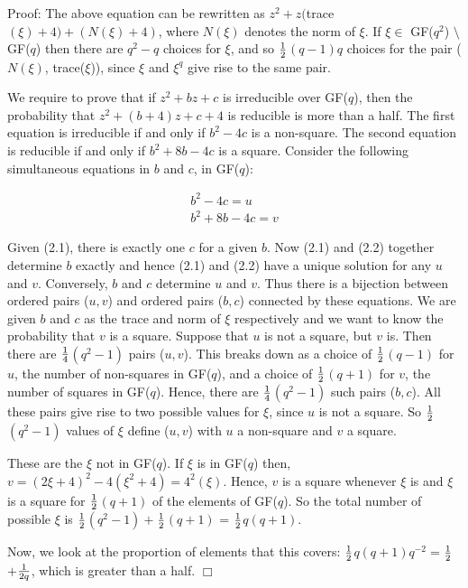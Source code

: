 \documentclass[12pt]{report}
\newenvironment{proof}{\normalsize {\sc Proof}:}{{\hfill $\Box$ \\}}
\begin{document}
\begin{proof}
The above equation can be rewritten as $z^2 + z($trace$(\xi) + 4) + (N(\xi) + 4)$, where $N(\xi)$ denotes the norm of $\xi$. If $\xi \in$ GF($q^2$) $\setminus$ GF($q$) then there are $q^2 - q$ choices for $\xi$, and so $1\over2$$(q-1)q$ choices for the pair ($N(\xi)$, trace($\xi$)), since $\xi$ and $\xi^q$ give rise to the same pair.

We require to prove that if $z^2 + bz + c$ is irreducible over GF($q$), then the probability that $z^2 + (b + 4)z + c + 4$ is reducible is more than a half. The first equation is irreducible if and only if $b^2 - 4c$ is a non-square. The second equation is reducible if and only if $b^2 + 8b - 4c$ is a square. Consider the following simultaneous equations in $b$ and $c$, in GF($q$):

\begin{eqnarray}
b^2-4c = u \\
b^2+8b-4c = v
\end{eqnarray}

Given (2.1), there is exactly one $c$ for a given $b$. Now (2.1) and (2.2) together determine $b$ exactly and hence (2.1) and (2.2) have a unique solution for any $u$ and $v$. Conversely, $b$ and $c$ determine $u$ and $v$. Thus there is a bijection between ordered pairs ($u, v$) and ordered pairs ($b ,c$) connected by these equations. We are given $b$ and $c$ as the trace and norm of $\xi$ respectively and we want to know the probability that $v$ is a square. Suppose that $u$ is not a square, but $v$ is. Then there are $1\over4$$(q^2-1)$ pairs ($u, v$). This breaks down as a choice of $1\over2$$(q-1)$ for $u$, the number of non-squares in GF($q$), and a choice of $1\over2$$(q+1)$ for $v$, the number of squares in GF($q$). Hence, there are $1\over4$$(q^2-1)$ such pairs ($b, c$). All these pairs give rise to two possible values for $\xi$, since $u$ is not a square. So $1\over2$$(q^2-1)$ values of $\xi$ define ($u,v$) with $u$ a non-square and $v$ a square.

These are the $\xi$ not in GF($q$). If $\xi$ is in GF($q$) then, $v = (2\xi + 4)^2 - 4(\xi^2 + 4) = 4^2 (\xi)$. Hence, $v$ is a square whenever $\xi$ is and $\xi$ is a square for $1\over2$$(q+1)$ of the elements of GF($q$). So the total number of possible $\xi$ is $1\over2$$(q^2- 1) + $$1\over2$$(q+1)$ = $1\over2$$q(q + 1)$.

Now, we look at the proportion of elements that this covers: $1\over2$$q(q + 1) q^{-2} = $$1\over2$$+ $$1\over2q$, which is greater than a half.
\end{proof}
\end{document}
